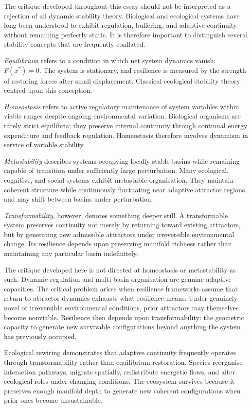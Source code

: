 \documentclass[11pt,a4paper]{article}
\begin{document}
The critique developed throughout this essay should not be interpreted as a rejection of all dynamic stability theory. Biological and ecological systems have long been understood to exhibit regulation, buffering, and adaptive continuity without remaining perfectly static. It is therefore important to distinguish several stability concepts that are frequently conflated.

\emph{Equilibrium} refers to a condition in which net system dynamics vanish: $F(x^\ast)=0$. The system is stationary, and resilience is measured by the strength of restoring forces after small displacement. Classical ecological stability theory centred upon this conception.

\emph{Homeostasis} refers to active regulatory maintenance of system variables within viable ranges despite ongoing environmental variation. Biological organisms are rarely strict equilibria; they preserve internal continuity through continual energy expenditure and feedback regulation. Homeostasis therefore involves dynamism in service of variable stability.

\emph{Metastability} describes systems occupying locally stable basins while remaining capable of transition under sufficiently large perturbation. Many ecological, cognitive, and social systems exhibit metastable organisation. They maintain coherent structure while continuously fluctuating near adaptive attractor regions, and may shift between basins under perturbation.

\emph{Transformability}, however, denotes something deeper still. A transformable system preserves continuity not merely by returning toward existing attractors, but by generating new admissible attractors under irreversible environmental change. Its resilience depends upon preserving manifold richness rather than maintaining any particular basin indefinitely.

The critique developed here is not directed at homeostasis or metastability as such. Dynamic regulation and multi-basin organisation are genuine adaptive capacities. The critical problem arises when resilience frameworks assume that return-to-attractor dynamics exhausts what resilience means. Under genuinely novel or irreversible environmental conditions, prior attractors may themselves become nonviable. Resilience then depends upon transformability: the geometric capacity to generate new survivable configurations beyond anything the system has previously occupied.

Ecological rewiring demonstrates that adaptive continuity frequently operates through transformability rather than equilibrium restoration. Species reorganise interaction pathways, migrate spatially, redistribute energetic flows, and alter ecological roles under changing conditions. The ecosystem survives because it preserves enough manifold depth to generate new coherent configurations when prior ones become unsustainable.
\end{document}
